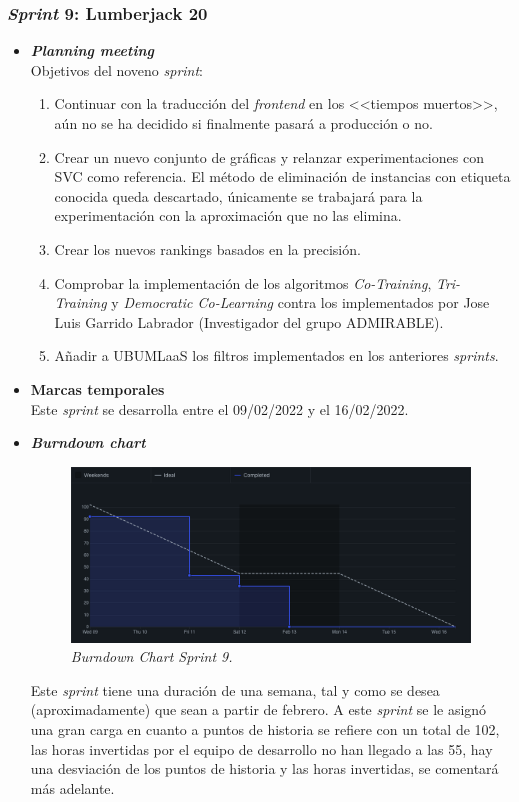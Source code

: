 \subsubsection{\textit{Sprint} 9: Lumberjack 20}
\begin{itemize}
\item \textbf{\textit{Planning meeting}}\\
Objetivos del noveno \textit{sprint}:
\begin{enumerate}
\item Continuar con la traducción del \textit{frontend} en los <<tiempos muertos>>, aún no se ha decidido si finalmente pasará a producción o no.
\item Crear un nuevo conjunto de gráficas y relanzar experimentaciones con SVC como referencia. El método de eliminación de instancias con etiqueta conocida queda descartado, únicamente se trabajará para la experimentación con la aproximación que no las elimina.
\item Crear los nuevos rankings basados en la precisión. 
\item Comprobar la implementación de los algoritmos \textit{Co-Training}, \textit{Tri-Training} y \textit{Democratic Co-Learning} contra los implementados por Jose Luis Garrido Labrador (Investigador del grupo ADMIRABLE).
\item Añadir a UBUMLaaS los filtros implementados en los anteriores \textit{sprints}.
\end{enumerate}

\item \textbf{Marcas temporales}\\
Este \textit{sprint} se desarrolla entre el 09/02/2022 y el 16/02/2022.

\item \textbf{\textit{Burndown chart}}\\
\begin{figure}
\begin{center}
\includegraphics[width=\textwidth]{../img/anexos/sprints/BD-Sprint9}
\caption{\textit{Burndown Chart Sprint 9.}}\label{fig:BD-Sprint9}
\end{center}
\end{figure}
Este \textit{sprint} tiene una duración de una semana, tal y como se desea (aproximadamente) que sean a partir de febrero. A este \textit{sprint} se le asignó una gran carga en cuanto a puntos de historia se refiere con un total de 102, las horas invertidas por el equipo de desarrollo no han llegado a las 55, hay una desviación de los puntos de historia y las horas invertidas, se comentará más adelante.


\end{itemize}
